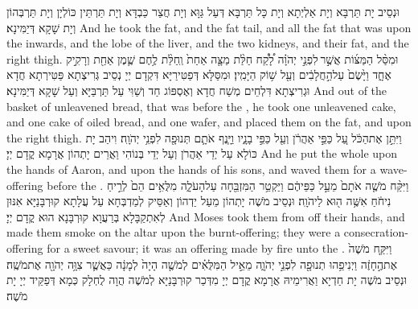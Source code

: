 {וּנְסֵיב יָת תַּרְבָּא וְיָת אַלְיְתָא וְיָת כָּל תַּרְבָּא דְּעַל גַּוָּא וְיָת חֲצַר כַּבְדָּא וְיָת תַּרְתֵּין כּוֹלְיָן וְיָת תַּרְבְּהוֹן וְיָת שָׁקָא דְּיַמִּינָא׃}
{And he took the fat, and the fat tail, and all the fat that was upon the inwards, and the lobe of the liver, and the two kidneys, and their fat, and the right thigh.}{}
{וּמִסַּ֨ל הַמַּצּ֜וֹת אֲשֶׁ֣ר \legarmeh  לִפְנֵ֣י יְהֹוָ֗ה לָ֠קַ֠ח חַלַּ֨ת מַצָּ֤ה אַחַת֙ וְֽחַלַּ֨ת לֶ֥חֶם שֶׁ֛מֶן אַחַ֖ת וְרָקִ֣יק אֶחָ֑ד וַיָּ֙שֶׂם֙ עַל\maqqaf הַ֣חֲלָבִ֔ים וְעַ֖ל שׁ֥וֹק הַיָּמִֽין׃}
{וּמִסַּלָּא דְּפַטִּירַיָּא דִּקְדָם יְיָ נְסֵיב גְּרִיצְתָא פַּטִּירְתָא חֲדָא וּגְרִיצְתָא דִּלְחֵים מְשַׁח חֲדָא וְאֶסְפּוֹג חַד וְשַׁוִּי עַל תַּרְבַּיָּא וְעַל שָׁקָא דְּיַמִּינָא׃}
{And out of the basket of unleavened bread, that was before the \lord, he took one unleavened cake, and one cake of oiled bread, and one wafer, and placed them on the fat, and upon the right thigh.}{}
{וַיִּתֵּ֣ן אֶת\maqqaf הַכֹּ֔ל עַ֚ל כַּפֵּ֣י אַהֲרֹ֔ן וְעַ֖ל כַּפֵּ֣י בָנָ֑יו וַיָּ֧נֶף אֹתָ֛ם תְּנוּפָ֖ה לִפְנֵ֥י יְהֹוָֽה׃}
{וִיהַב יָת כּוֹלָא עַל יְדֵי אַהֲרֹן וְעַל יְדֵי בְּנוֹהִי וַאֲרֵים יָתְהוֹן אֲרָמָא קֳדָם יְיָ׃}
{And he put the whole upon the hands of Aaron, and upon the hands of his sons, and waved them for a wave-offering before the \lord.}{}
{וַיִּקַּ֨ח מֹשֶׁ֤ה אֹתָם֙ מֵעַ֣ל כַּפֵּיהֶ֔ם וַיַּקְטֵ֥ר הַמִּזְבֵּ֖חָה עַל\maqqaf הָעֹלָ֑ה מִלֻּאִ֥ים הֵם֙ לְרֵ֣יחַ נִיחֹ֔חַ אִשֶּׁ֥ה ה֖וּא לַיהֹוָֽה׃}
{וּנְסֵיב מֹשֶׁה יָתְהוֹן מֵעַל יַדְהוֹן וְאַסֵּיק לְמַדְבְּחָא עַל עֲלָתָא קוּרְבָּנַיָּא אִנּוּן לְאִתְקַבָּלָא בְּרַעֲוָא קוּרְבָּנָא הוּא קֳדָם יְיָ׃}
{And Moses took them from off their hands, and made them smoke on the altar upon the burnt-offering; they were a consecration-offering for a sweet savour; it was an offering made by fire unto the \lord.}{}
{וַיִּקַּ֤ח מֹשֶׁה֙ אֶת\maqqaf הֶ֣חָזֶ֔ה וַיְנִיפֵ֥הוּ תְנוּפָ֖ה לִפְנֵ֣י יְהֹוָ֑ה מֵאֵ֣יל הַמִּלֻּאִ֗ים לְמֹשֶׁ֤ה הָיָה֙ לְמָנָ֔ה כַּאֲשֶׁ֛ר צִוָּ֥ה יְהֹוָ֖ה אֶת\maqqaf מֹשֶֽׁה׃}
{וּנְסֵיב מֹשֶׁה יָת חַדְיָא וַאֲרִימֵיהּ אֲרָמָא קֳדָם יְיָ מִדְּכַר קוּרְבָּנַיָּא לְמֹשֶׁה הֲוָה לֻחְלָק כְּמָא דְּפַקֵּיד יְיָ יָת מֹשֶׁה׃}
